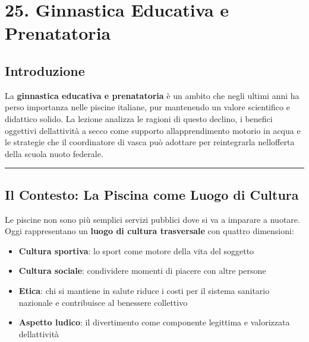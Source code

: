 \documentclass[a4paper,11pt]{article}
\providecommand{\tightlist}{%
  \setlength{\itemsep}{0pt}\setlength{\parskip}{0pt}}
\begin{document}
\section{25. Ginnastica Educativa e
  Prenatatoria}\label{ginnastica-educativa-e-prenatatoria}

\subsection{Introduzione}\label{introduzione-24}

La \textbf{ginnastica educativa e prenatatoria} è un ambito che negli
ultimi anni ha perso importanza nelle piscine italiane, pur mantenendo
un valore scientifico e didattico solido. La lezione analizza le ragioni
di questo declino, i benefici oggettivi dell\textquotesingle attività a
secco come supporto all\textquotesingle apprendimento motorio in acqua e
le strategie che il coordinatore di vasca può adottare per reintegrarla
nell\textquotesingle offerta della scuola nuoto federale.

\begin{center}\rule{0.5\linewidth}{0.5pt}\end{center}

\subsection{Il Contesto: La Piscina come Luogo di
      Cultura}\label{il-contesto-la-piscina-come-luogo-di-cultura}

Le piscine non sono più semplici servizi pubblici dove si va a imparare
a nuotare. Oggi rappresentano un \textbf{luogo di cultura trasversale}
con quattro dimensioni:

\begin{itemize}
      \tightlist
      \item
            \textbf{Cultura sportiva}: lo sport come motore della vita del
            soggetto
      \item
            \textbf{Cultura sociale}: condividere momenti di piacere con altre
            persone
      \item
            \textbf{Etica}: chi si mantiene in salute riduce i costi per il
            sistema sanitario nazionale e contribuisce al benessere collettivo
      \item
            \textbf{Aspetto ludico}: il divertimento come componente legittima e
            valorizzata dell\textquotesingle attività
\end{itemize}
\end{document}
